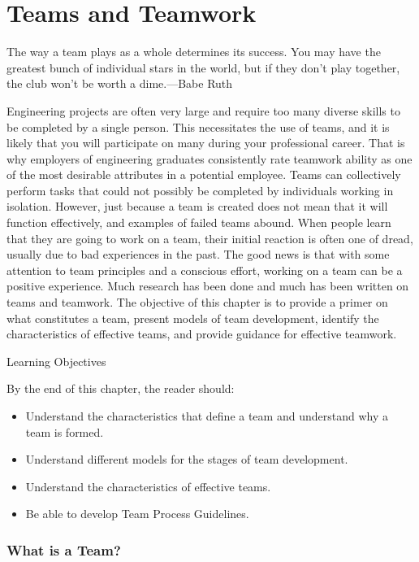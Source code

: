 \chapter{Teams and Teamwork}
\label{teams-and-teamwork}

The way a team plays as a whole determines its success. You may have the
greatest bunch of individual stars in the world, but if they don't play
together, the club won't be worth a dime.---Babe Ruth

Engineering projects are often very large and require too many diverse
skills to be completed by a single person. This necessitates the use of
teams, and it is likely that you will participate on many during your
professional career. That is why employers of engineering graduates
consistently rate teamwork ability as one of the most desirable
attributes in a potential employee. Teams can collectively perform tasks
that could not possibly be completed by individuals working in
isolation. However, just because a team is created does not mean that it
will function effectively, and examples of failed teams abound. When
people learn that they are going to work on a team, their initial
reaction is often one of dread, usually due to bad experiences in the
past. The good news is that with some attention to team principles and a
conscious effort, working on a team can be a positive experience. Much
research has been done and much has been written on teams and teamwork.
The objective of this chapter is to provide a primer on what constitutes
a team, present models of team development, identify the characteristics
of effective teams, and provide guidance for effective teamwork.

Learning Objectives

By the end of this chapter, the reader should:

\begin{itemize}
\item
  Understand the characteristics that define a team and understand why a
  team is formed.
\item
  Understand different models for the stages of team development.
\item
  Understand the characteristics of effective teams.
\item
  Be able to develop Team Process Guidelines.
\end{itemize}

\subsection{What is a Team?}\label{what-is-a-team}

